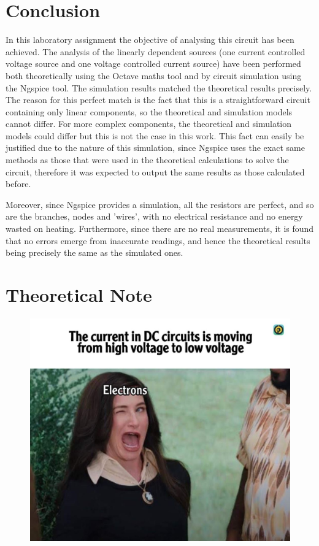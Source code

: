 \section{Conclusion}
\label{sec:conclusion}

In this laboratory assignment the objective of analysing this circuit has been
achieved. The analysis of the linearly dependent sources (one current controlled voltage source and one voltage controlled current source) have been performed both theoretically using the Octave maths tool and by circuit simulation using the
Ngspice tool. The simulation results matched the theoretical results
precisely. The reason for this perfect match is the fact that this is a
straightforward circuit containing only linear components, so the theoretical
and simulation models cannot differ. For more complex components, the
theoretical and simulation models could differ but this is not the case in this
work. This fact can easily be justified due to the nature of this simulation, since Ngspice uses the exact same methods as those that were used in the theoretical calculations to solve the circuit, therefore it was expected to output the same results as those calculated before. 
 \par Moreover, since Ngspice provides a simulation, all the resistors are perfect, and so are the branches, nodes and 'wires', with no electrical resistance  and no energy wasted on heating. Furthermore, since there are no real measurements, it is found that no errors emerge from inaccurate readings, and hence the theoretical results being precisely the same as the simulated ones.


\section{Theoretical Note}
\label{sec:final_note}

\begin{figure}[h] \centering
\includegraphics[width=0.7\linewidth]{meme.JPG}
\label{fig:Meme}
\end{figure}